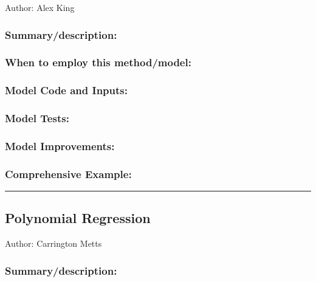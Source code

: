 \documentclass[
]{article}
\begin{document}
Author: Alex King

\hypertarget{summarydescription-3}{%
\subsubsection{Summary/description:}\label{summarydescription-3}}

\hypertarget{when-to-employ-this-methodmodel-3}{%
\subsubsection{When to employ this
method/model:}\label{when-to-employ-this-methodmodel-3}}

\hypertarget{model-code-and-inputs-3}{%
\subsubsection{Model Code and Inputs:}\label{model-code-and-inputs-3}}

\hypertarget{model-tests-3}{%
\subsubsection{Model Tests:}\label{model-tests-3}}

\hypertarget{model-improvements-3}{%
\subsubsection{Model Improvements:}\label{model-improvements-3}}

\hypertarget{comprehensive-example-3}{%
\subsubsection{Comprehensive Example:}\label{comprehensive-example-3}}

\begin{center}\rule{0.5\linewidth}{0.5pt}\end{center}

\hypertarget{polynomial-regression}{%
\subsection{Polynomial Regression}\label{polynomial-regression}}

Author: Carrington Metts

\hypertarget{summarydescription-4}{%
\subsubsection{Summary/description:}\label{summarydescription-4}}
\end{document}
